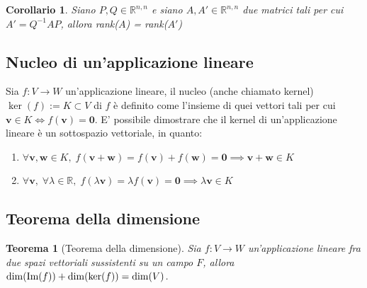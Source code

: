\documentclass{article}
\newtheorem{theorem}{Teorema}
\newtheorem{corollary}{Corollario}[theorem]
\begin{document}
    \begin{corollary}
        Siano $P, Q \in \mathbb{R}^{n, n}$ e siano $A, A' \in \mathbb{R}^{n, n}$ due matrici tali per cui $A' = Q^{-1}AP$, allora rank($A$) = rank($A'$)
    \end{corollary}



\vspace{10pt}
\subsection{Nucleo di un'applicazione lineare}
    Sia $f: V \rightarrow W$ un'applicazione lineare, il nucleo (anche chiamato kernel) $\ker(f) := K \subset V$ di $f$ è definito come l'insieme di quei vettori tali per cui $\mathbf{v} \in K \iff f(\mathbf{v}) = \mathbf{0}$.
    E' possibile dimostrare che il kernel di un'applicazione lineare è un sottospazio vettoriale, in quanto:

    \begin{enumerate}[label=(\arabic*)]
        \item $\forall \mathbf{v}, \mathbf{w} \in K, \; f(\mathbf{v} + \mathbf{w}) = f(\mathbf{v}) + f(\mathbf{w}) = \mathbf{0} \implies \mathbf{v} + \mathbf{w} \in K$ 
        \item $\forall \mathbf{v}, \; \forall \lambda \in \mathbb{R}, \; f(\lambda \mathbf{v}) = \lambda f(\mathbf{v}) = \mathbf{0} \implies \lambda \mathbf{v} \in K$ 
    \end{enumerate} 


    
\vspace{10pt}
\subsection{Teorema della dimensione}
    \begin{theorem}[Teorema della dimensione]
        Sia $f : V \rightarrow W$ un'applicazione lineare fra due spazi vettoriali sussistenti su un campo $F$, allora $\dim(\textnormal{Im}(f)) + \dim(\ker(f)) = \dim(V)$.
    \end{theorem}
\end{document}
